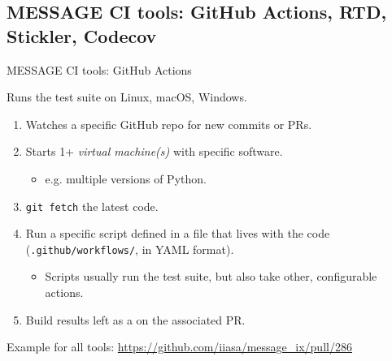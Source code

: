 \documentclass[12pt,aspectratio=169]{beamer}
\begin{document}
\subsection{MESSAGE CI tools: GitHub Actions, RTD, Stickler, Codecov}
\begin{frame}{MESSAGE CI tools: GitHub Actions}

{\Large Runs the test suite on Linux, macOS, Windows.}

\bigskip
\begin{enumerate}
  \item Watches a specific GitHub repo for new commits or PRs.
  \item Starts 1+ \emph{virtual machine(s)} with specific software.
    \begin{itemize}
      \item e.g. multiple versions of Python.
    \end{itemize}
  \item \texttt{git fetch} the latest code.
  \item Run a specific script defined in a file that lives with the code
    (\texttt{.github/workflows/}, in YAML format).
    \begin{itemize}
      \item Scripts usually run the test suite, but also take other, configurable actions.
    \end{itemize}
  \item Build results left as a  on the associated PR.
\end{enumerate}

\bigskip
Example for all tools: \url{https://github.com/iiasa/message_ix/pull/286}

\end{frame}

%
%
%
\end{document}
